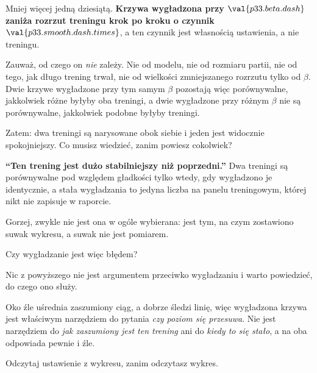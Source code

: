 \begin{fr}
Mniej więcej jedną dziesiątą. \textbf{Krzywa wygładzona przy
$\val{p33.beta.dash}$ zaniża rozrzut treningu krok po kroku o czynnik
$\val{p33.smooth.dash.times}$}, a ten czynnik jest własnością ustawienia, a
nie treningu.

Zauważ, od czego on \emph{nie} zależy. Nie od modelu, nie od rozmiaru partii,
nie od tego, jak długo trening trwał, nie od wielkości zmniejszanego rozrzutu
\dash{} tylko od $\beta$. Dwie krzywe wygładzone przy tym samym $\beta$
pozostają więc porównywalne, jakkolwiek różne byłyby oba treningi, a dwie
wygładzone przy różnym $\beta$ nie są porównywalne, jakkolwiek podobne byłyby
treningi.

Zatem: dwa treningi są narysowane obok siebie i jeden jest widocznie
spokojniejszy. Co musisz wiedzieć, zanim powiesz cokolwiek?
\dotline
\nextframe
\end{fr}

\begin{fr}
\begin{trapbox}
\textbf{\enquote{Ten trening jest dużo stabilniejszy niż poprzedni.}} Dwa
treningi są porównywalne pod względem gładkości tylko wtedy, gdy wygładzono je
identycznie, a stała wygładzania to jedyna liczba na panelu treningowym,
której nikt nie zapisuje w raporcie.

Gorzej, zwykle nie jest ona w ogóle wybierana: jest tym, na czym zostawiono
suwak wykresu, a suwak nie jest pomiarem.
\end{trapbox}

Czy wygładzanie jest więc błędem?
\dotline
\nextframe
\end{fr}

\begin{fr}
Nic z powyższego nie jest argumentem przeciwko wygładzaniu i warto powiedzieć,
do czego ono służy.

Oko źle uśrednia zaszumiony ciąg, a dobrze śledzi linię, więc wygładzona
krzywa jest właściwym narzędziem do pytania \emph{czy poziom się przesuwa}.
Nie jest narzędziem do \emph{jak zaszumiony jest ten trening} ani do
\emph{kiedy to się stało}, a na oba odpowiada pewnie i źle.

Odczytaj ustawienie z wykresu, zanim odczytasz wykres.
\end{fr}


